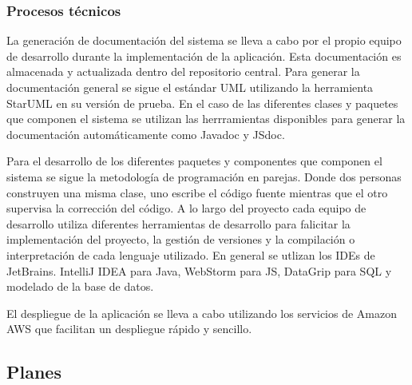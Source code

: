 \subsubsection{Procesos técnicos}

La generación de documentación del sistema se lleva a cabo por el propio equipo de desarrollo durante la implementación de la aplicación. Esta documentación es almacenada y actualizada dentro del repositorio central. Para generar la documentación general se sigue el estándar UML utilizando la herramienta StarUML en su versión de prueba. En el caso de las diferentes clases y paquetes que componen el sistema se utilizan las herrramientas disponibles para generar la documentación automáticamente como Javadoc y JSdoc.

Para el desarrollo de los diferentes paquetes y componentes que componen el sistema se sigue la metodología de programación en parejas. Donde dos personas construyen una misma clase, uno escribe el código fuente mientras que el otro supervisa la corrección del código. A lo largo del proyecto cada equipo de desarrollo utiliza diferentes herramientas de desarrollo para falicitar la implementación del proyecto, la gestión de versiones y la compilación o interpretación de cada lenguaje utilizado. En general se utlizan los IDEs de JetBrains. IntelliJ IDEA para Java, WebStorm para JS, DataGrip para SQL y modelado de la base de datos.

El despliegue de la aplicación se lleva a cabo utilizando los servicios de Amazon AWS que facilitan un despliegue rápido y sencillo.

\subsection{Planes}
\label{pl}
